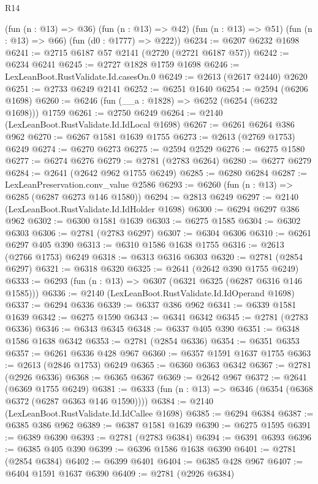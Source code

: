 \begin{lexlean}{R14}
\begin{coremodule}
      (fun (n : @13) => @36)
      (fun (n : @13) => @42)
      (fun (n : @13) => @51)
      (fun (n : @13) => @66)
      (fun (d0 : @1777) => @222))
@6234 := @6207 @6232 @1698
@6241 := @2715 @6187 @57 @2141 (@2720 (@2721 @6187 @57))
@6242 := @6234 @6241
@6245 := @2727 @1828 @1759 @1698
@6246 := LexLeanBoot.RustValidate.Id.casesOn.{0}
@6249 := @2613 (@2617 @2440) @2620
@6251 := @2733 @6249 @2141
@6252 := @6251 @1640
@6254 := @2594 (@6206 @1698)
@6260 := @6246 (fun (__a : @1828) => @6252 (@6254 (@6232 @1698))) @1759
@6261 := @2750 @6249
@6264 := @2140 (LexLeanBoot.RustValidate.Id.IdLocal @1698)
@6267 := @6261 @6264 @386 @962
@6270 := @6267 @1581 @1639 @1755
@6273 := @2613 (@2769 @1753) @6249
@6274 := @6270 @6273
@6275 := @2594 @2529
@6276 := @6275 @1580
@6277 := @6274 @6276
@6279 := @2781 (@2783 @6264)
@6280 := @6277 @6279
@6284 := @2641 (@2642 @962 @1755 @6249)
@6285 := @6280 @6284
@6287 := LexLeanPreservation.conv_value @2586
@6293 := @6260 (fun (n : @13) => @6285 (@6287 @6273 @146 @1580))
@6294 := @2813 @6249
@6297 := @2140 (LexLeanBoot.RustValidate.Id.IdHolder @1698)
@6300 := @6294 @6297 @386 @962
@6302 := @6300 @1581 @1639
@6303 := @6275 @1585
@6304 := @6302 @6303
@6306 := @2781 (@2783 @6297)
@6307 := @6304 @6306
@6310 := @6261 @6297 @405 @390
@6313 := @6310 @1586 @1638 @1755
@6316 := @2613 (@2766 @1753) @6249
@6318 := @6313 @6316 @6303
@6320 := @2781 (@2854 @6297)
@6321 := @6318 @6320
@6325 := @2641 (@2642 @390 @1755 @6249)
@6333 := @6293 (fun (n : @13) => @6307 (@6321 @6325 (@6287 @6316 @146 @1585)))
@6336 := @2140 (LexLeanBoot.RustValidate.Id.IdOperand @1698)
@6337 := @6294 @6336
@6339 := @6337 @386 @962
@6341 := @6339 @1581 @1639
@6342 := @6275 @1590
@6343 := @6341 @6342
@6345 := @2781 (@2783 @6336)
@6346 := @6343 @6345
@6348 := @6337 @405 @390
@6351 := @6348 @1586 @1638 @6342
@6353 := @2781 (@2854 @6336)
@6354 := @6351 @6353
@6357 := @6261 @6336 @428 @967
@6360 := @6357 @1591 @1637 @1755
@6363 := @2613 (@2846 @1753) @6249
@6365 := @6360 @6363 @6342
@6367 := @2781 (@2926 @6336)
@6368 := @6365 @6367
@6369 := @2642 @967
@6372 := @2641 (@6369 @1755 @6249)
@6381 := @6333 (fun (n : @13) => @6346 (@6354 (@6368 @6372 (@6287 @6363 @146 @1590))))
@6384 := @2140 (LexLeanBoot.RustValidate.Id.IdCallee @1698)
@6385 := @6294 @6384
@6387 := @6385 @386 @962
@6389 := @6387 @1581 @1639
@6390 := @6275 @1595
@6391 := @6389 @6390
@6393 := @2781 (@2783 @6384)
@6394 := @6391 @6393
@6396 := @6385 @405 @390
@6399 := @6396 @1586 @1638 @6390
@6401 := @2781 (@2854 @6384)
@6402 := @6399 @6401
@6404 := @6385 @428 @967
@6407 := @6404 @1591 @1637 @6390
@6409 := @2781 (@2926 @6384)

\end{coremodule}
\end{lexlean}
